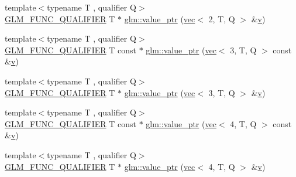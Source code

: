 \begin{DoxyCompactItemize}
\item 
{\footnotesize template$<$typename T , qualifier Q$>$ }\\\mbox{\hyperlink{setup_8hpp_a33fdea6f91c5f834105f7415e2a64407}{G\+L\+M\+\_\+\+F\+U\+N\+C\+\_\+\+Q\+U\+A\+L\+I\+F\+I\+ER}} T $\ast$ \mbox{\hyperlink{group__gtc__type__ptr_ga54d4e779df698b9d951378dc0de5149d}{glm\+::value\+\_\+ptr}} (\mbox{\hyperlink{structglm_1_1vec}{vec}}$<$ 2, T, Q $>$ \&\mbox{\hyperlink{_s_d_l__opengl_8h_a10a82eabcb59d2fcd74acee063775f90}{v}})
\item 
{\footnotesize template$<$typename T , qualifier Q$>$ }\\\mbox{\hyperlink{setup_8hpp_a33fdea6f91c5f834105f7415e2a64407}{G\+L\+M\+\_\+\+F\+U\+N\+C\+\_\+\+Q\+U\+A\+L\+I\+F\+I\+ER}} T const  $\ast$ \mbox{\hyperlink{group__gtc__type__ptr_ga1b0d55a139927496b86be0e2948279a8}{glm\+::value\+\_\+ptr}} (\mbox{\hyperlink{structglm_1_1vec}{vec}}$<$ 3, T, Q $>$ const \&\mbox{\hyperlink{_s_d_l__opengl_8h_a10a82eabcb59d2fcd74acee063775f90}{v}})
\item 
{\footnotesize template$<$typename T , qualifier Q$>$ }\\\mbox{\hyperlink{setup_8hpp_a33fdea6f91c5f834105f7415e2a64407}{G\+L\+M\+\_\+\+F\+U\+N\+C\+\_\+\+Q\+U\+A\+L\+I\+F\+I\+ER}} T $\ast$ \mbox{\hyperlink{group__gtc__type__ptr_gabca52e90fd530ff2e8344d3f66326ccd}{glm\+::value\+\_\+ptr}} (\mbox{\hyperlink{structglm_1_1vec}{vec}}$<$ 3, T, Q $>$ \&\mbox{\hyperlink{_s_d_l__opengl_8h_a10a82eabcb59d2fcd74acee063775f90}{v}})
\item 
{\footnotesize template$<$typename T , qualifier Q$>$ }\\\mbox{\hyperlink{setup_8hpp_a33fdea6f91c5f834105f7415e2a64407}{G\+L\+M\+\_\+\+F\+U\+N\+C\+\_\+\+Q\+U\+A\+L\+I\+F\+I\+ER}} T const  $\ast$ \mbox{\hyperlink{group__gtc__type__ptr_gace63685baa09872656962c2695900c48}{glm\+::value\+\_\+ptr}} (\mbox{\hyperlink{structglm_1_1vec}{vec}}$<$ 4, T, Q $>$ const \&\mbox{\hyperlink{_s_d_l__opengl_8h_a10a82eabcb59d2fcd74acee063775f90}{v}})
\item 
{\footnotesize template$<$typename T , qualifier Q$>$ }\\\mbox{\hyperlink{setup_8hpp_a33fdea6f91c5f834105f7415e2a64407}{G\+L\+M\+\_\+\+F\+U\+N\+C\+\_\+\+Q\+U\+A\+L\+I\+F\+I\+ER}} T $\ast$ \mbox{\hyperlink{group__gtc__type__ptr_gae0ad6ab684abf10a87cadb95a9137fa2}{glm\+::value\+\_\+ptr}} (\mbox{\hyperlink{structglm_1_1vec}{vec}}$<$ 4, T, Q $>$ \&\mbox{\hyperlink{_s_d_l__opengl_8h_a10a82eabcb59d2fcd74acee063775f90}{v}})
\item 

\end{DoxyCompactItemize}
